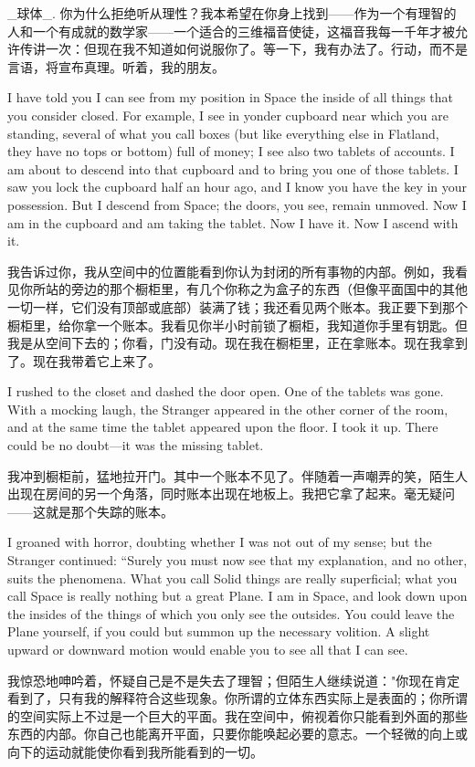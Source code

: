 \documentclass[12pt,UTF8]{ctexbook}
\begin{document}
\_球体\_. 你为什么拒绝听从理性？我本希望在你身上找到——作为一个有理智的人和一个有成就的数学家——一个适合的三维福音使徒，这福音我每一千年才被允许传讲一次：但现在我不知道如何说服你了。等一下，我有办法了。行动，而不是言语，将宣布真理。听着，我的朋友。

I have told you I can see from my position in Space the inside of all things that you consider closed. For example, I see in yonder cupboard near which you are standing, several of what you call boxes (but like everything else in Flatland, they have no tops or bottom) full of money; I see also two tablets of accounts. I am about to descend into that cupboard and to bring you one of those tablets. I saw you lock the cupboard half an hour ago, and I know you have the key in your possession. But I descend from Space; the doors, you see, remain unmoved. Now I am in the cupboard and am taking the tablet. Now I have it. Now I ascend with it.

我告诉过你，我从空间中的位置能看到你认为封闭的所有事物的内部。例如，我看见你所站的旁边的那个橱柜里，有几个你称之为盒子的东西（但像平面国中的其他一切一样，它们没有顶部或底部）装满了钱；我还看见两个账本。我正要下到那个橱柜里，给你拿一个账本。我看见你半小时前锁了橱柜，我知道你手里有钥匙。但我是从空间下去的；你看，门没有动。现在我在橱柜里，正在拿账本。现在我拿到了。现在我带着它上来了。

I rushed to the closet and dashed the door open. One of the tablets was gone. With a mocking laugh, the Stranger appeared in the other corner of the room, and at the same time the tablet appeared upon the floor. I took it up. There could be no doubt---it was the missing tablet.

我冲到橱柜前，猛地拉开门。其中一个账本不见了。伴随着一声嘲弄的笑，陌生人出现在房间的另一个角落，同时账本出现在地板上。我把它拿了起来。毫无疑问——这就是那个失踪的账本。

I groaned with horror, doubting whether I was not out of my sense; but the Stranger continued: ``Surely you must now see that my explanation, and no other, suits the phenomena. What you call Solid things are really superficial; what you call Space is really nothing but a great Plane. I am in Space, and look down upon the insides of the things of which you only see the outsides. You could leave the Plane yourself, if you could but summon up the necessary volition. A slight upward or downward motion would enable you to see all that I can see.

我惊恐地呻吟着，怀疑自己是不是失去了理智；但陌生人继续说道："你现在肯定看到了，只有我的解释符合这些现象。你所谓的立体东西实际上是表面的；你所谓的空间实际上不过是一个巨大的平面。我在空间中，俯视着你只能看到外面的那些东西的内部。你自己也能离开平面，只要你能唤起必要的意志。一个轻微的向上或向下的运动就能使你看到我所能看到的一切。
\end{document}
